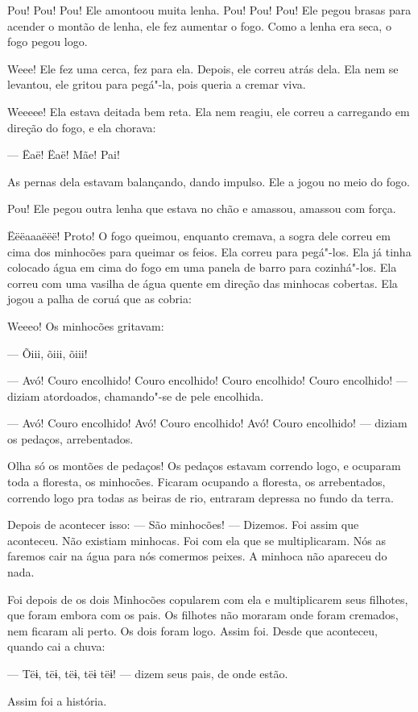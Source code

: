 Pou! Pou! Pou! Ele amontoou muita lenha. Pou! Pou! Pou! Ele pegou
brasas para acender o montão de lenha, ele fez aumentar o fogo. Como a
lenha era seca, o fogo pegou logo. 

Weee! Ele fez uma cerca, fez para ela. Depois, ele correu atrás dela.
Ela nem se levantou, ele gritou para pegá"-la, pois queria a cremar viva. 

Weeeee! Ela estava deitada bem reta. Ela nem reagiu, ele correu a carregando
em direção do fogo, e ela chorava: 

--- Ëaë! Ëaë! Mãe! Pai! 

As pernas dela estavam balançando, dando impulso. Ele a jogou no meio
do fogo. 

Pou! Ele pegou outra lenha que estava no chão e amassou, amassou com
força. 

Ëëëaaaëëë! Proto! O fogo queimou, enquanto cremava, a sogra dele correu
em cima dos minhocões para queimar os feios. Ela correu para pegá"-los.
Ela já tinha colocado água em cima do fogo em uma panela de barro para
cozinhá"-los. Ela correu com uma vasilha de água quente em direção das
minhocas cobertas. Ela jogou a palha de coruá que as cobria: 

Weeeo! Os minhocões gritavam:

--- Õiii, õiii, õiii! 

--- Avó! Couro encolhido! Couro encolhido! Couro encolhido! Couro
encolhido! --- diziam atordoados, chamando"-se de pele encolhida. 

--- Avó! Couro encolhido! Avó! Couro encolhido! Avó! Couro encolhido! ---
diziam os pedaços, arrebentados. 

Olha só os montões de pedaços! Os pedaços estavam correndo logo, e
ocuparam toda a floresta, os minhocões. Ficaram ocupando a floresta, os
arrebentados, correndo logo pra todas as beiras de rio, entraram depressa
no fundo da terra. 

Depois de acontecer isso: --- São minhocões! --- Dizemos. Foi assim que aconteceu.
Não existiam minhocas. Foi com ela que se multiplicaram. Nós as faremos
cair na água para nós comermos peixes. A minhoca não apareceu do nada. 

Foi depois de os dois Minhocões copularem com ela e multiplicarem seus
filhotes, que foram embora com os pais. Os filhotes não moraram onde
foram cremados, nem ficaram ali perto. Os dois foram logo. Assim foi. Desde
que aconteceu, quando cai a chuva:

--- Tëɨ, tëɨ, tëɨ, tëɨ tëɨ! --- dizem seus pais, de onde estão. 

Assim foi a história.

